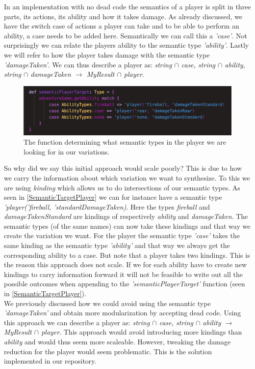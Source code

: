 In an implementation with no dead code the semantics of a player is split in three parts, its actions, its ability and how it takes damage. As already discussed, we have the switch case of actions a player can take and to be able to perform an ability, a case needs to be added here. Semantically we can call this a \textit{'case'}. Not surprisingly we can relate the players ability to the semantic type \textit{'ability'}. Lastly we will refer to how the player takes damage with the semantic type \textit{'damageTaken'}. We can thus describe a player as: \textit{string $\cap$ case, string $\cap$ ability, string $\cap$ damageTaken $\to$ MyResult $\cap$ player}.

\begin{figure}[H]
	\centering
	\includegraphics[width=0.9\linewidth]{Materials/Decomposition/SemanticTargetPlayer}
	\caption{The function determining what semantic types in the player we are looking for in our variations.}
	\label{SemanticTargetPlayer}
\end{figure}
So why did we say this initial approach would scale poorly? This is due to how we carry the information about which variation we want to synthesize. To this we are using \textit{kinding} which allows us to do intersections of our semantic types. As seen in \autoref{SemanticTargetPlayer} we can for instance have a semantic type \textit{'player('fireball, 'standardDamageTaken)}. Here the types \textit{fireball} and \textit{damageTakenStandard} are kindings of respectively \textit{ability} and \textit{damageTaken}. The semantic types (of the same names) can now take these kindings and that way we create the variation we want. For the player the semantic type \textit{'case'} takes the same kinding as the semantic type \textit{'ability'} and that way we always get the corresponding ability to a case. But note that a player takes two kindings. This is the reason this approach does not scale. If we for each ability have to create new kindings to carry information forward it will not be feasible to write out all the possible outcomes when appending to the \textit{'semanticPlayerTarget'} function (seen in \autoref{SemanticTargetPlayer}).\\
We previously discussed how we could avoid using the semantic type \textit{'damageTaken'} and obtain more modularization by accepting dead code. Using this approach we can describe a player as: \textit{string $\cap$ case, string $\cap$ ability $\to$ MyResult $\cap$ player}. This approach would avoid introducing more kindings than \textit{ability} and would thus seem more scaleable. However, tweaking the damage reduction for the player would seem problematic. This is the solution implemented in our repository.\\
